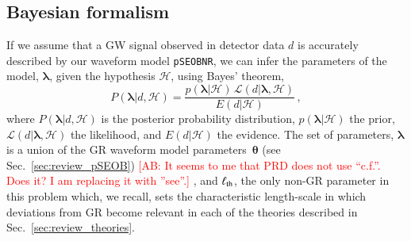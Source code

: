 \documentclass[twocolumn,
               prd,
               aps,
               superscriptaddress,
               tightenlines,
               nofootinbib,
               eqsecnum,
               amsfonts,
               amsmath,
               longbibliography]{revtex4-1}
\newcommand{\pSEOB}{\texttt{pSEOBNR}}
\newcommand{\abcomm}[1]{{\textcolor{red}{{[AB: #1]}} }}
\begin{document}
\subsection{Bayesian formalism}
If we assume that a GW signal observed in detector data $d$ is accurately
described by our waveform model \pSEOB{}, we can infer the parameters of the
model, $\bm{\lambda}$, given the hypothesis $\mathcal{H}$, using Bayes' theorem,
%
\begin{equation}
P(\bm{\lambda} \vert d, \mathcal{H}) =
\frac{p(\bm{\lambda} \vert \mathcal{H}) \, \mathcal{L}(d \vert \bm{\lambda},\mathcal{H})}{E(d \vert \mathcal{H})}\,,
\label{eq:bayes}
\end{equation}
%
where $P(\bm{\lambda} \vert d, \mathcal{H})$ is the posterior probability distribution,
$p(\bm{\lambda} \vert \mathcal{H})$ the prior,
$\mathcal{L}(d \vert \bm{\lambda},\mathcal{H})$ the likelihood, and
$E(d \vert \mathcal{H})$ the evidence.
%
The set of parameters, $\bm{\lambda}$ is a union of the GR waveform
model parameters~$\bm{\theta}$ (see Sec.~\ref{sec:review_pSEOB}) \abcomm{It seems to 
me that PRD does not use ``c.f.''. Does it? I am replacing it with ''see''.}, and
$\ell_{\rm th}$,  the only non-GR parameter in this problem which, we recall, sets
the characteristic length-scale in which deviations from
GR become relevant in each of the theories described in
Sec.~\ref{sec:review_theories}. %
%

\end{document}
